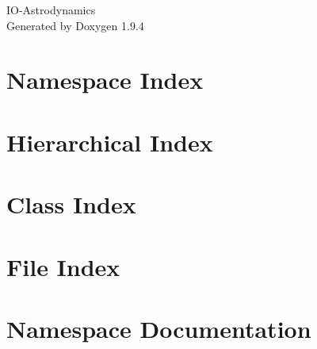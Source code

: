 \documentclass[twoside]{book}
\newcommand{\+}{\discretionary{\mbox{\scriptsize$\hookleftarrow$}}{}{}}
\newcommand{\clearemptydoublepage}{%
    \newpage{\pagestyle{empty}\cleardoublepage}%
  }
\begin{document}
  \raggedbottom
    \hypersetup{pageanchor=false,
                bookmarksnumbered=true,
                pdfencoding=unicode
               }
  \begin{titlepage}
  \vspace*{7cm}
  \begin{center}%
  {\Large IO-\/\+Astrodynamics}\\
  \vspace*{1cm}
  {\large Generated by Doxygen 1.9.4}\\
  \end{center}
  \end{titlepage}
  \clearemptydoublepage
  \tableofcontents
  \clearemptydoublepage
  \hypersetup{pageanchor=true}
\chapter{Namespace Index}

\chapter{Hierarchical Index}

\chapter{Class Index}

\chapter{File Index}

\chapter{Namespace Documentation}



























\end{document}
